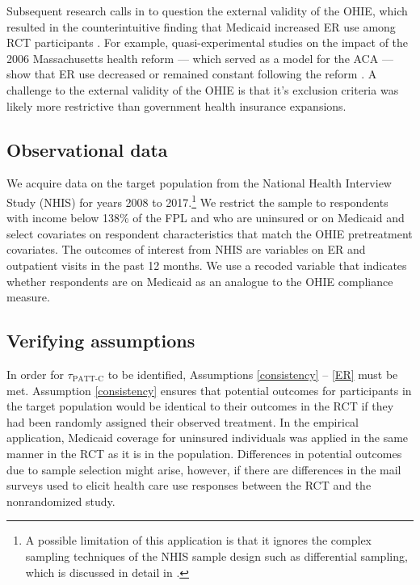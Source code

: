 \documentclass[hidelinks,12pt]{article}
\begin{document}
Subsequent research calls in to question the external validity of the OHIE, which resulted in the counterintuitive finding that Medicaid increased ER use among RCT participants \citep{finkelstein2012,Taubman}. For example, quasi-experimental studies on the impact of the 2006 Massachusetts health reform --- which served as a model for the ACA --- show that ER use decreased or remained constant following the reform \citep{miller2012effect, kolstad2012impact}. A challenge to the external validity of the OHIE is that it's exclusion criteria was likely more restrictive than government health insurance expansions. 

\subsection{Observational data} 

We acquire data on the target population from the National Health Interview Study (NHIS) for years 2008 to 2017.\footnote{A possible limitation of this application is that it ignores the complex sampling techniques of the NHIS sample design such as differential sampling, which is discussed in detail in \citet{parsons2014design}.} We restrict the sample to respondents with income below 138\% of the FPL and who are uninsured or on Medicaid and select covariates on respondent characteristics that match the OHIE pretreatment covariates. The outcomes of interest from NHIS are variables on ER and outpatient visits in the past 12 months. We use a recoded variable that indicates whether respondents are on Medicaid as an analogue to the OHIE compliance measure. 

\subsection{Verifying assumptions} \label{verifying}

In order for $\tau_{\text{PATT-C}}$ to be identified, Assumptions \eqref{consistency} -- \eqref{ER} must be met. Assumption \eqref{consistency} ensures that potential outcomes for participants in the target population would be identical to their outcomes in the RCT if they had been randomly assigned their observed treatment. In the empirical application, Medicaid coverage for uninsured individuals was applied in the same manner in the RCT as it is in the population.  Differences in potential outcomes due to sample selection might arise, however, if there are differences in the mail surveys used to elicit health care use responses between the RCT and the nonrandomized study. 
\end{document}
